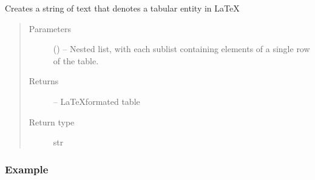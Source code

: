 \documentclass[letterpaper,10pt,english]{sphinxmanual}
\begin{document}
\begin{fulllineitems}
\label{\detokenize{references/write:nmrespy.write._latex_tabular}}
\sphinxAtStartPar
Creates a string of text that denotes a tabular entity in LaTeX
\begin{quote}\begin{description}
\item[{Parameters}] \leavevmode
\sphinxAtStartPar
{} () – Nested list, with each sublist containing elements of a single row
of the table.

\item[{Returns}] \leavevmode
\sphinxAtStartPar
{} – LaTeX\sphinxhyphen{}formated table

\item[{Return type}] \leavevmode
\sphinxAtStartPar
str

\end{description}\end{quote}
\subsubsection*{Example}

\begin{sphinxVerbatim}[commandchars=\\\{\}]
   
  \PYG{p}{[}\PYG{p}{[}  \PYG{p}{]} \PYG{p}{[}  \PYG{p}{]}\PYG{p}{]}
\end{sphinxVerbatim}

\end{fulllineitems}
\end{document}
